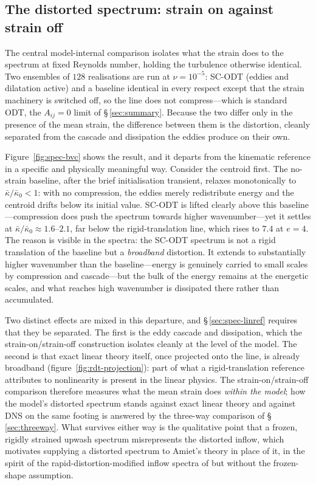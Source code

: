 \documentclass[11pt,a4paper]{article}
\newcounter{assumption}
\begin{document}
\subsection{The distorted spectrum: strain on against strain
off}\label{sec:spec-bvc}

The central model-internal comparison isolates what the strain does to
the spectrum at fixed Reynolds number, holding the turbulence otherwise
identical. Two ensembles of $128$ realisations are run at $\nu=10^{-5}$:
SC-ODT (eddies and dilatation active) and a baseline identical
in every respect except that the strain machinery is switched off, so
the line does not compress---which is standard ODT, the $A_{ij}=0$
limit of \S\,\ref{sec:summary}. Because the two differ only in the presence
of the mean strain, the difference between them is the distortion,
cleanly separated from the cascade and dissipation the eddies produce on
their own.

Figure~\ref{fig:spec-bvc} shows the result, and it departs from the
kinematic reference in a specific and physically meaningful way.
Consider the centroid first. The no-strain baseline, after the brief
initialisation transient, relaxes monotonically to
$\bar\kappa/\bar\kappa_0<1$: with no compression, the eddies merely
redistribute energy and the centroid drifts below its initial value.
SC-ODT is lifted clearly above this baseline---compression does push
the spectrum towards higher wavenumber---yet it settles at
$\bar\kappa/\bar\kappa_0\approx1.6$--$2.1$, far below the
rigid-translation line, which rises to $7.4$ at $e=4$. The reason is
visible in the spectra: the SC-ODT spectrum is not a rigid
translation of the baseline but a \emph{broadband} distortion. It
extends to substantially higher wavenumber than the baseline---energy is
genuinely carried to small scales by compression and cascade---but the
bulk of the energy remains at the energetic scales, and what reaches
high wavenumber is dissipated there rather than accumulated.

Two distinct effects are mixed in this departure, and
\S\,\ref{sec:spec-linref} requires that they be separated. The first is
the eddy cascade and dissipation, which the strain-on/strain-off
construction isolates cleanly at the level of the model. The second is
that exact linear theory itself, once projected onto the line, is
already broadband (figure~\ref{fig:rdt-projection}): part of what a
rigid-translation reference attributes to nonlinearity is present in the
linear physics. The strain-on/strain-off comparison therefore measures
what the mean strain does \emph{within the model}; how the model's
distorted spectrum stands against exact linear theory and against DNS on
the same footing is answered by the three-way comparison of
\S\,\ref{sec:threeway}. What survives either way is the qualitative
point that a frozen, rigidly strained upwash spectrum misrepresents the
distorted inflow, which motivates supplying a distorted spectrum to
Amiet's theory in place of it, in the spirit of the
rapid-distortion-modified inflow spectra of \citet{deSantana2016} but
without the frozen-shape assumption.
\end{document}

